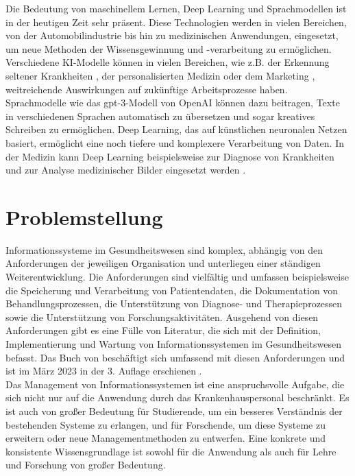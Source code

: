 Die Bedeutung von maschinellem Lernen, Deep Learning und Sprachmodellen ist in der heutigen Zeit sehr präsent.
Diese Technologien werden in vielen Bereichen, von der Automobilindustrie bis hin zu medizinischen Anwendungen, eingesetzt, um neue Methoden der Wissensgewinnung und -verarbeitung zu ermöglichen.
Verschiedene KI-Modelle können in vielen Bereichen, wie z.B. der Erkennung seltener Krankheiten \citep{rare_diseases}, der personalisierten Medizin \citep{precision_med} oder dem Marketing \citep{ai_marketing}, weitreichende Auswirkungen auf zukünftige Arbeitsprozesse haben.
Sprachmodelle wie das \ac{gpt}-3-Modell von OpenAI \citep{gpt3} können dazu beitragen, Texte in verschiedenen Sprachen automatisch zu übersetzen und sogar kreatives Schreiben zu ermöglichen.
Deep Learning, das auf künstlichen neuronalen Netzen basiert, ermöglicht eine noch tiefere und komplexere Verarbeitung von Daten.
In der Medizin kann Deep Learning beispielsweise zur Diagnose von Krankheiten und zur Analyse medizinischer Bilder eingesetzt werden \citep{skincancer}.

\section{Problemstellung}\label{sec:problemstellung}
Informationssysteme im Gesundheitswesen sind komplex, abhängig von den Anforderungen der jeweiligen Organisation und unterliegen einer ständigen Weiterentwicklung.
Die Anforderungen sind vielfältig und umfassen beispielsweise die Speicherung und Verarbeitung von Patientendaten, die Dokumentation von Behandlungsprozessen, die Unterstützung von Diagnose- und Therapieprozessen sowie die Unterstützung von Forschungsaktivitäten.
Ausgehend von diesen Anforderungen gibt es eine Fülle von Literatur, die sich mit der Definition, Implementierung und Wartung von Informationssystemen im Gesundheitswesen befasst.
Das Buch  von \citeauthor{bb} beschäftigt sich umfassend mit diesen Anforderungen und ist im März 2023 in der 3. Auflage erschienen \citep{bb}.\\

Das Management von Informationssystemen ist eine anspruchsvolle Aufgabe, die sich nicht nur auf die Anwendung durch das Krankenhauspersonal beschränkt.
Es ist auch von großer Bedeutung für Studierende, um ein besseres Verständnis der bestehenden Systeme zu erlangen, und für Forschende, um diese Systeme zu erweitern oder neue Managementmethoden zu entwerfen.
Eine konkrete und konsistente Wissensgrundlage ist sowohl für die Anwendung als auch für Lehre und Forschung von großer Bedeutung.\\

